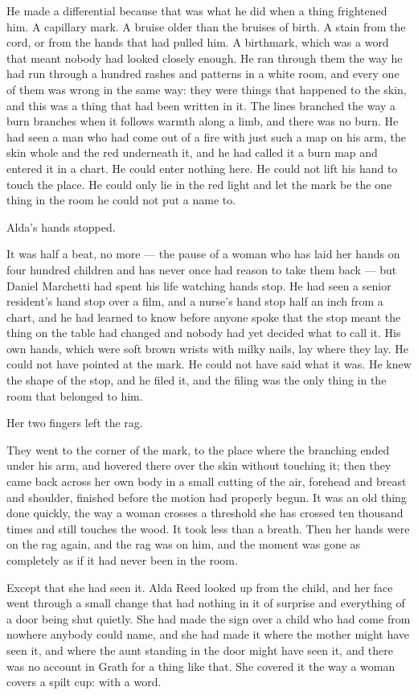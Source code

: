 He made a differential because that was what he did when a thing frightened him. A capillary mark. A bruise older than the bruises of birth. A stain from the cord, or from the hands that had pulled him. A birthmark, which was a word that meant nobody had looked closely enough. He ran through them the way he had run through a hundred rashes and patterns in a white room, and every one of them was wrong in the same way: they were things that happened to the skin, and this was a thing that had been written in it. The lines branched the way a burn branches when it follows warmth along a limb, and there was no burn. He had seen a man who had come out of a fire with just such a map on his arm, the skin whole and the red underneath it, and he had called it a burn map and entered it in a chart. He could enter nothing here. He could not lift his hand to touch the place. He could only lie in the red light and let the mark be the one thing in the room he could not put a name to.

Alda's hands stopped.

It was half a beat, no more --- the pause of a woman who has laid her hands on four hundred children and has never once had reason to take them back --- but Daniel Marchetti had spent his life watching hands stop. He had seen a senior resident's hand stop over a film, and a nurse's hand stop half an inch from a chart, and he had learned to know before anyone spoke that the stop meant the thing on the table had changed and nobody had yet decided what to call it. His own hands, which were soft brown wrists with milky nails, lay where they lay. He could not have pointed at the mark. He could not have said what it was. He knew the shape of the stop, and he filed it, and the filing was the only thing in the room that belonged to him.

Her two fingers left the rag.

They went to the corner of the mark, to the place where the branching ended under his arm, and hovered there over the skin without touching it; then they came back across her own body in a small cutting of the air, forehead and breast and shoulder, finished before the motion had properly begun. It was an old thing done quickly, the way a woman crosses a threshold she has crossed ten thousand times and still touches the wood. It took less than a breath. Then her hands were on the rag again, and the rag was on him, and the moment was gone as completely as if it had never been in the room.

Except that she had seen it. Alda Reed looked up from the child, and her face went through a small change that had nothing in it of surprise and everything of a door being shut quietly. She had made the sign over a child who had come from nowhere anybody could name, and she had made it where the mother might have seen it, and where the aunt standing in the door might have seen it, and there was no account in Grath for a thing like that. She covered it the way a woman covers a spilt cup: with a word.

